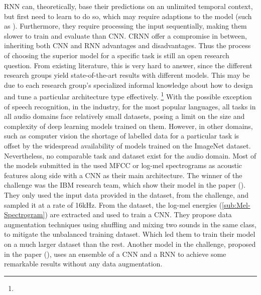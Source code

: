 \newline
\newline
\gls{RNN} can, theoretically, base their predictions on an unlimited temporal context, but first need to learn to do so, which may require adaptions to the model (such as ). Furthermore, they require processing the input sequentially, making them slower to train and evaluate than \gls{CNN}. \gls{CRNN} offer a compromise in between, inheriting both \gls{CNN} and \gls{RNN} advantages and disadvantages.
\newline
\newline
Thus the process of choosing the superior model for a specific task is still an open research question. From existing literature, this is very hard to answer, since the different research groups yield state-of-the-art results with different models. This may be due to each research group’s specialized informal knowledge about how to design and tune a particular architecture type effectively. \footnote{}
\newline
\newline
With the possible exception of speech recognition, in the industry, for the most popular languages, all tasks in all audio domains face relatively small datasets, posing a limit on the size and complexity of deep learning models trained on them. However, in other domains, such as computer vision the shortage of labelled data for a particular task is offset by the widespread availability of models trained on the ImageNet dataset. Nevertheless, no comparable task and dataset exist for the audio domain.
\newline
\newline
Most of the models submitted in the  used \gls{MFCC} or log-mel spectrograms as acoustic features along side with a \gls{CNN} as their main architecture. The winner of the challenge was the IBM research team, which show their model in the paper (\cite{inoue_domestic_2018}). They only used the input data provided in the dataset, from the challenge, and sampled it at a rate of 16kHz. From the dataset, the log-mel energies (\ref{sub:Mel-Spectrogram}) are extracted and used to train a \gls{CNN}. They propose data augmentation techniques using shuffling and mixing two sounds in the same class, to mitigate the unbalanced training dataset. Which led them to train their model on a much larger dataset than the rest.
\newline
\newline
Another model in the challenge, proposed in the paper (\cite{liu_ensemble_2018}), uses an ensemble of a \gls{CNN} and a \gls{RNN} to achieve some remarkable results without any data augmentation. 